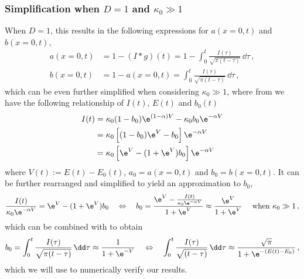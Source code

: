 \documentclass{prettytex/ox/mmsc-special-topic}
\begin{document}
  \subsubsection{Simplification when $D = 1$ and $\kappa_0 \gg 1$}
  When $D = 1$, this results in the following expressions for $a(x=0, t)$ and $b(x=0, t)$,
  \begin{align}
    \label{eq:laplace-a} a(x=0, t) & = 1 - (I * g)(t) = 1 - \int_{0}^{t} \frac{I(\tau)}{\sqrt{\pi (t - \tau)}} \,\dd\tau\,, \\
    \label{eq:laplace-b} b(x=0, t) & = 1 - a(x=0, t) = \int_{0}^{t} \frac{I(\tau)}{\sqrt{\pi (t - \tau)}} \,\dd\tau\,,
  \end{align}
  which can be even further simplified when considering $\kappa_0 \gg 1$, where from  we have the following relationship of $I(t)$, $E(t)$ and $b_0(t)$
  \begin{align*}
    I(t) & = \kappa_0 (1-b_0) \e^{(1-\alpha) V} - \kappa_0 b_0 \e^{-\alpha V} \\
         & = \kappa_0 \left[(1-b_0) \e^V - b_0\right] \e^{-\alpha V}          \\
         & = \kappa_0 \left[\e^V - (1+\e^V) b_0\right] \e^{-\alpha V}
  \end{align*}
  where $V(t) := E(t) - E_0(t)$, $a_0 = a(x=0, t)$ and $b_0 = b(x=0, t)$.
  It can be further rearranged and simplified to yield an approximation to $b_0$,
  \begin{align*}
    \frac{I(t)}{\kappa_0 \e^{-\alpha V}} = \e^V - (1+\e^V) b_0 \quad \Leftrightarrow \quad
    b_0 = \frac{\e^V - \frac{I(t)}{\kappa_0 \e^{-\alpha V}}}{1+\e^V} \approx \frac{\e^V}{1 + \e^V} \quad \text{ when } \kappa_0 \gg 1\,,
  \end{align*}
  which can be combined with  to obtain
  \begin{equation}
    b_0 = \int_{0}^{t} \frac{I(\tau)}{\sqrt{\pi (t - \tau)}} \,\dd\tau \approx \frac{1}{1+\e^{-V}} \quad \Leftrightarrow \quad \int_{0}^{t} \frac{I(\tau)}{\sqrt{(t - \tau)}} \,\dd\tau \approx \frac{\sqrt{\pi}}{1 + \e^{-(E(t) - E_0)}}\,,
    \label{eq:numerical-verification}
  \end{equation}
  which we will use to numerically verify our results.
\end{document}
